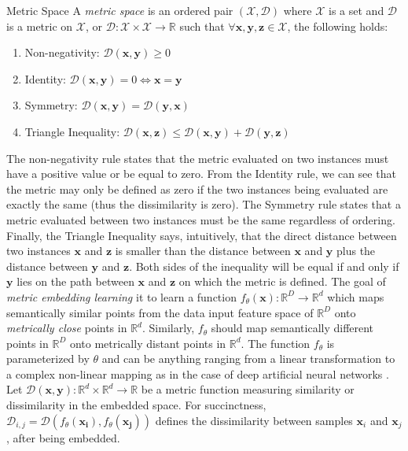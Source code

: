  \theoremstyle{definition}
 \begin{definition}{Metric Space}
 A \textit{metric space} is an ordered pair $(\mathcal{X},\mathcal{D})$ where $\mathcal{X}$ is a set and $\mathcal{D}$ is a metric on $\mathcal{X}$, or $\mathcal{D}:\mathcal{X} \times \mathcal{X} \rightarrow \mathbb{R}$ such that $\forall \bm{x},\bm{y},\bm{z}\in\mathcal{X}$, the following holds:

 \end{definition}
 	\begin{enumerate}
	\item Non-negativity: $\mathcal{D}(\bm{x},\bm{y}) \geq 0$
	\item Identity: $\mathcal{D}(\bm{x},\bm{y}) = 0 \iff \bm{x} = \bm{y} $
	\item Symmetry: $\mathcal{D}(\bm{x},\bm{y}) = \mathcal{D}(\bm{y},\bm{x})$
	\item Triangle Inequality:  $\mathcal{D}(\bm{x},\bm{z}) \leq \mathcal{D}(\bm{x},\bm{y}) + \mathcal{D}(\bm{y},\bm{z})$
	\end{enumerate}
\noindent
The non-negativity rule states that the metric evaluated on two instances must have a positive value or be equal to zero.  From the Identity rule, we can see that the metric may only be defined as zero if the two instances being evaluated are exactly the same (thus the dissimilarity is zero).  The Symmetry rule states that a metric evaluated between two instances must be the same regardless of ordering.  Finally, the Triangle Inequality says, intuitively, that the direct distance between two instances $\bm{x}$ and $\bm{z}$ is smaller than the distance between $\bm{x}$ and $\bm{y}$ plus the distance between $\bm{y}$ and $\bm{z}$.  Both sides of the inequality will be equal if and only if $\bm{y}$ lies on the path between $\bm{x}$ and $\bm{z}$ on which the metric is defined.  \newline
The goal of \textit{metric embedding learning} it to learn a function $f_{\theta}(\bm{x}):\mathbb{R}^{D} \rightarrow \mathbb{R}^{d}$ which maps semantically similar points from the data input feature space of $\mathbb{R}^{D}$ onto \textit{metrically close} points in $\mathbb{R}^{d}$.  Similarly, $f_{\theta}$ should map semantically different points in $\mathbb{R}^{D}$ onto metrically distant points in $\mathbb{R}^{d}$.  The function $f_{\theta}$ is parameterized by $\theta$ and can be anything ranging from a linear transformation to a complex non-linear mapping as in the case of deep artificial neural networks \citep{Hermans2017DefenseTripletLoss}.  Let $\mathcal{D}(\bm{x},\bm{ y}): \mathbb{R}^{d} \times \mathbb{R}^{d} \rightarrow \mathbb{R}$ be a metric function measuring similarity or dissimilarity in the embedded space.  For succinctness, $\mathcal{D}_{i,j} = \mathcal{D}(f_{\theta}(\bm{x_{i}}),f_{\theta}(\bm{x_{j}}))$
defines the dissimilarity between samples $\bm{x}_{i}$ and $\bm{x}_{j}$, after being embedded.


